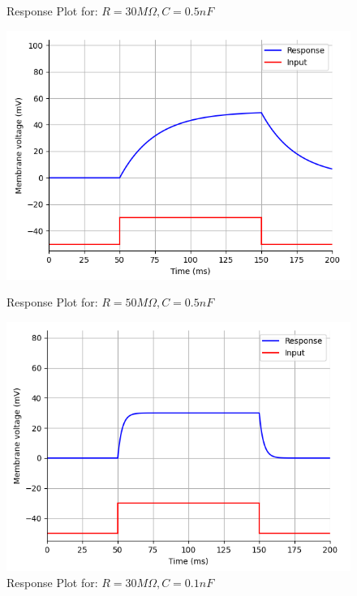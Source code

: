 \documentclass{article}
\begin{document}
\begin{figure}[htbp]
\begin{minipage}[b]{0.3\textwidth}
            \caption{Response Plot for: $R = 30 M\Omega, C = 0.5nF$}
        \end{minipage}
        \hfill
        \begin{minipage}[b]{0.3\textwidth}
            \includegraphics[width=\textwidth]{R50C0.5.png}
            \caption{Response Plot for: $R = 50 M\Omega, C = 0.5nF$}
        \end{minipage}
        \hfill
        \begin{minipage}[b]{0.3\textwidth}
            \includegraphics[width=\textwidth]{R30C0.1.png}
            \caption{Response Plot for: $R = 30 M\Omega, C = 0.1nF$}
        \end{minipage}
        \hfill
        \begin{minipage}[b]{0.3\textwidth}

\end{minipage}
\end{figure}
\end{document}
